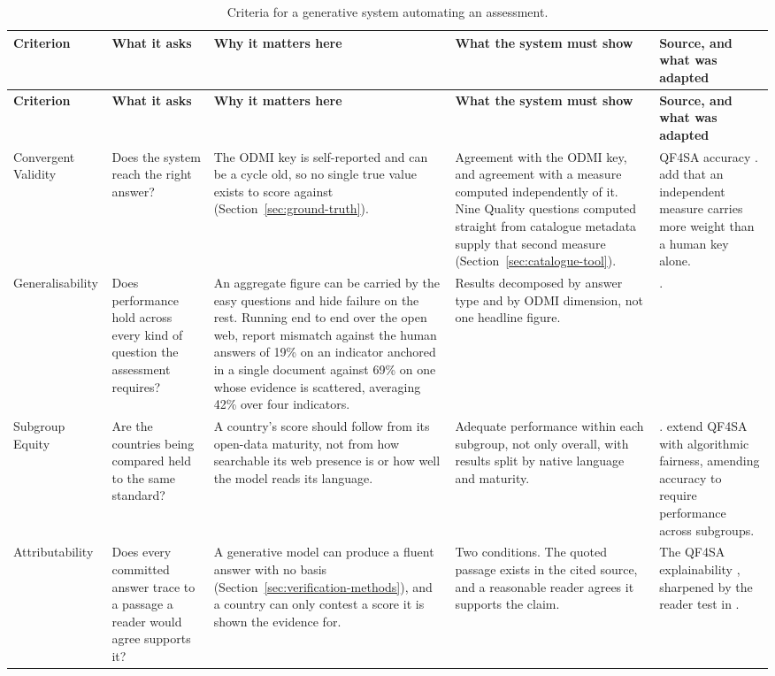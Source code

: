 {\footnotesize
\begin{longtable}[]{@{}
  L{0.1565}
  L{0.1568}
  L{0.2586}
  L{0.2295}
  L{0.1985}@{}}
\caption{Criteria for a generative system automating an assessment.}\label{tab:criteria}\\
\toprule\noalign{}
\textbf{Criterion} & \textbf{What it asks} & \textbf{Why it matters here} & \textbf{What the system must show} & \textbf{Source, and what was adapted} \\
\midrule\noalign{}
\endfirsthead
\toprule\noalign{}
\textbf{Criterion} & \textbf{What it asks} & \textbf{Why it matters here} & \textbf{What the system must show} & \textbf{Source, and what was adapted} \\
\midrule\noalign{}
\endhead
\bottomrule\noalign{}
\endlastfoot
Convergent Validity & Does the system reach the right answer? & The ODMI key is self-reported and can be a cycle old, so no single true value exists to score against (Section~\ref{sec:ground-truth}). & Agreement with the ODMI key, and agreement with a measure computed independently of it. Nine Quality questions computed straight from catalogue metadata supply that second measure (Section~\ref{sec:catalogue-tool}). & QF4SA accuracy \citep{yung2022}. \citet{williamson2012} add that an independent measure carries more weight than a human key alone. \\
General\-isability & Does performance hold across every kind of question the assessment requires? & An aggregate figure can be carried by the easy questions and hide failure on the rest. Running end to end over the open web, \citet{fumega2026} report mismatch against the human answers of 19\% on an indicator anchored in a single document against 69\% on one whose evidence is scattered, averaging 42\% over four indicators. & Results decomposed by answer type and by ODMI dimension, not one headline figure. & \citet{williamson2012}. \\
Subgroup Equity & Are the countries being compared held to the same standard? & A country's score should follow from its open-data maturity, not from how searchable its web presence is or how well the model reads its language. & Adequate performance within each subgroup, not only overall, with results split by native language and maturity. & \citet{williamson2012}. \citet{schenk2024} extend QF4SA with algorithmic fairness, amending accuracy to require performance across subgroups. \\
Attribut\-ability & Does every committed answer trace to a passage a reader would agree supports it? & A generative model can produce a fluent answer with no basis (Section~\ref{sec:verification-methods}), and a country can only contest a score it is shown the evidence for. & Two conditions. The quoted passage exists in the cited source, and a reasonable reader agrees it supports the claim. & The QF4SA explainability \citep{yung2022}, sharpened by the reader test in \citet{rashkin2023}. \\

\end{longtable}}
